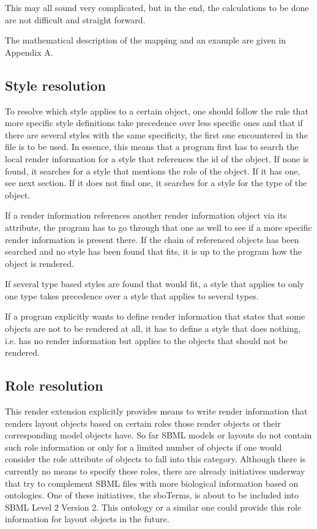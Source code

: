 This may all sound very complicated, but in the end, the calculations to be done are not difficult and straight forward. 

The mathematical description of the mapping and an example are given in Appendix A.


\subsection{Style resolution}
To resolve which style applies to a certain object, one 
should follow the rule that more specific style definitions take precedence 
over less specific ones and that if there are several styles with the same 
specificity, the first one encountered in the file is to be used. In essence,
this means that a program first has to search the local render information for 
a style that references the id of the object. If none is found, it searches for 
a style that mentions the role of the object. If it has one, see next section. 
If it does not find one, it searches for a style for the type of the object. 

If a render information references another render information object via its 
 attribute, the program has to go through 
that one as well to see if a more specific render information is present there. 
If the chain of referenced \RenderInformation objects has been searched and no 
style has been found that fits, it is up to the program how the object is 
rendered. 

If several type based styles are found 
that would fit, a style that applies to only one type takes precedence over a 
style that applies to several types.

If a program explicitly wants to define render information that 
states that some objects are not to be rendered at all, it has to define a 
style that does nothing, i.e. has no render information but applies to the 
objects that should not be rendered. 


\subsection{Role resolution}
This render extension explicitly provides means to write render information
that renders layout objects based on certain roles those render objects or their
corresponding model objects have. So far SBML models or layouts do not contain
such role information or only for a limited number of objects if one would
consider the role attribute of \SpeciesReferenceGlyph objects to fall into this category.
Although there is currently no means to specify these roles, there are already
initiatives underway that try to complement SBML files with more biological
information based on ontologies. One of these initiatives, the sboTerms, is
about to be included into SBML Level 2 Version 2. This ontology or a similar
one could provide this role information for layout objects in the future.   

